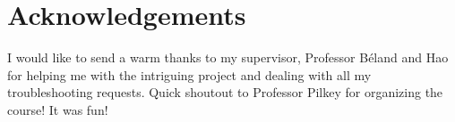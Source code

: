 \documentclass[9pt,twocolumn,twoside]{opticajnl}
\begin{document}
\section*{Acknowledgements}
I would like to send a warm thanks to my supervisor, Professor Béland and Hao for helping me with the intriguing project and dealing with all my troubleshooting requests. Quick shoutout to Professor Pilkey for organizing the course! It was fun!












\end{document}
